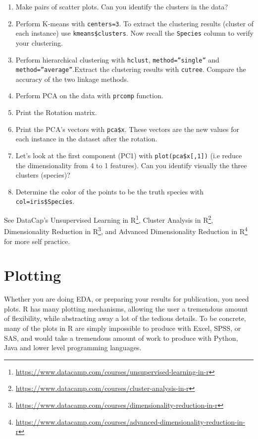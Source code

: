 \documentclass[]{book}
\providecommand{\tightlist}{%
  \setlength{\itemsep}{0pt}\setlength{\parskip}{0pt}}
\renewcommand{\href}[2]{#2\footnote{\url{#1}}}
\theoremstyle{definition}
\theoremstyle{definition}
\theoremstyle{definition}
\theoremstyle{remark}
\begin{document}
\begin{enumerate}
  \begin{enumerate}
  \def\labelenumii{\arabic{enumii}.}
  \tightlist
  \item
    Make pairs of scatter plots. Can you identify the clusters in the data?
  \item
    Perform K-means with \texttt{centers=3}. To extract the clustering results (cluster of each instance) use \texttt{kmeans\$clusters}. Now recall the \texttt{Species} column to verify your clustering.
  \item
    Perform hierarchical clustering with \texttt{hclust}, \texttt{method=”single”} and \texttt{method=”average”}.Extract the clustering results with \texttt{cutree}. Compare the accuracy of the two linkage methods.
  \item
    Perform PCA on the data with \texttt{prcomp} function.
  \item
    Print the Rotation matrix.
  \item
    Print the PCA's vectors with \texttt{pca\$x}. These vectors are the new values for each instance in the dataset after the rotation.
  \item
    Let's look at the first component (PC1) with \texttt{plot(pca\$x{[},1{]})} (i.e reduce the dimensionality from 4 to 1 features). Can you identify visually the three clusters (species)?\\
  \item
    Determine the color of the points to be the truth species with \texttt{col=iris\$Species}.
  \end{enumerate}
\end{enumerate}

See DataCap's
\href{https://www.datacamp.com/courses/unsupervised-learning-in-r}{Unsupervised Learning in R},
\href{https://www.datacamp.com/courses/cluster-analysis-in-r}{Cluster Analysis in R},
\href{https://www.datacamp.com/courses/dimensionality-reduction-in-r}{Dimensionality Reduction in R}, and
\href{https://www.datacamp.com/courses/advanced-dimensionality-reduction-in-r}{Advanced Dimensionality Reduction in R}
for more self practice.

\hypertarget{plotting}{%
\chapter{Plotting}\label{plotting}}

Whether you are doing EDA, or preparing your results for publication, you need plots.
R has many plotting mechanisms, allowing the user a tremendous amount of flexibility, while abstracting away a lot of the tedious details.
To be concrete, many of the plots in R are simply impossible to produce with Excel, SPSS, or SAS, and would take a tremendous amount of work to produce with Python, Java and lower level programming languages.
\end{document}
